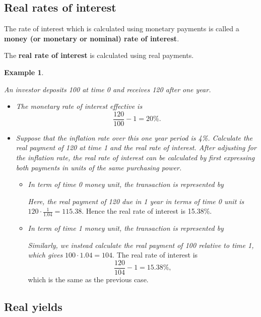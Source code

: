 \documentclass[
]{book}
\theoremstyle{definition}
\theoremstyle{definition}
\newtheorem{example}{Example}[chapter]
\theoremstyle{definition}
\theoremstyle{definition}
\theoremstyle{remark}
\begin{document}
\hypertarget{real-rates-of-interest}{%
\subsection{Real rates of interest}\label{real-rates-of-interest}}

The rate of interest which is calculated using monetary payments is
called a \textbf{money (or monetary or nominal) rate of interest}.

The \textbf{real rate of interest} is calculated using real payments.

\begin{example}
\protect\hypertarget{exm:unlabeled-div-61}{}\label{exm:unlabeled-div-61}

\emph{An investor deposits 100 at time 0 and receives 120 after one year.}

\begin{itemize}
\item
  \emph{The monetary rate of interest effective is}
  \[\frac{120}{100} - 1 = 20\%.\]
\item
  \emph{Suppose that the inflation rate over this one year period is 4\%.
  Calculate the real payment of 120 at time 1 and the real rate of
  interest. After adjusting for the inflation rate, the real rate of
  interest can be calculated by first expressing both payments in
  units of the same purchasing power.}

  \begin{itemize}
  \item
    \emph{In term of time 0 money unit, the transaction is represented
    by}

    \emph{Here, the real payment of 120 due in 1 year in terms of time 0
    unit is} \(\displaystyle{120 \cdot \frac{1}{1.04} = 115.38}\).
    Hence the real rate of interest is 15.38\%.
  \item
    \emph{In term of time 1 money unit, the transaction is represented
    by}

    \emph{Similarly, we instead calculate the real payment of 100
    relative to time 1, which gives} \(100 \cdot 1.04 = 104\). The
    real rate of interest is \[\frac{120}{104} - 1 = 15.38\%,\]
    which is the same as the previous case.
  \end{itemize}
\end{itemize}

\end{example}

\hypertarget{real-yields}{%
\subsection{Real yields}\label{real-yields}}
\end{document}

